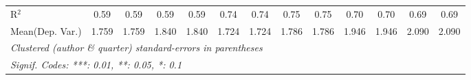 \begin{tabular}{lcccccccccccc}
   R$^2$                                    & 0.59    & 0.59           & 0.59    & 0.59           & 0.74    & 0.74          & 0.75    & 0.75         & 0.70    & 0.70          & 0.69    & 0.69\\  
Mean(Dep. Var.) & 1.759 & 1.759 & 1.840 & 1.840 & 1.724 & 1.724 & 1.786 & 1.786 & 1.946 & 1.946 & 2.090 & 2.090 \\
   \midrule \midrule
   \multicolumn{13}{l}{\emph{Clustered (author \& quarter) standard-errors in parentheses}}\\
   \multicolumn{13}{l}{\emph{Signif. Codes: ***: 0.01, **: 0.05, *: 0.1}}\\
\end{tabular}
\par\endgroup
